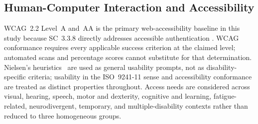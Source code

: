 \documentclass[journal]{IEEEtran}
\begin{document}
\subsection{Human-Computer Interaction and Accessibility}
WCAG~2.2 Level~A and~AA is the primary web-accessibility baseline in this study because SC~3.3.8 directly addresses accessible authentication \cite{wcag22}. WCAG conformance requires every applicable success criterion at the claimed level; automated scans and percentage scores cannot substitute for that determination. Nielsen's heuristics~\cite{nielsen1994usability,nielsen1992finding} are used as general usability prompts, not as disability-specific criteria; usability in the ISO~9241-11 sense \cite{iso9241} and accessibility conformance are treated as distinct properties throughout. Access needs are considered across visual, hearing, speech, motor and dexterity, cognitive and learning, fatigue-related, neurodivergent, temporary, and multiple-disability contexts \cite{who2023disability} rather than reduced to three homogeneous groups.
\end{document}
